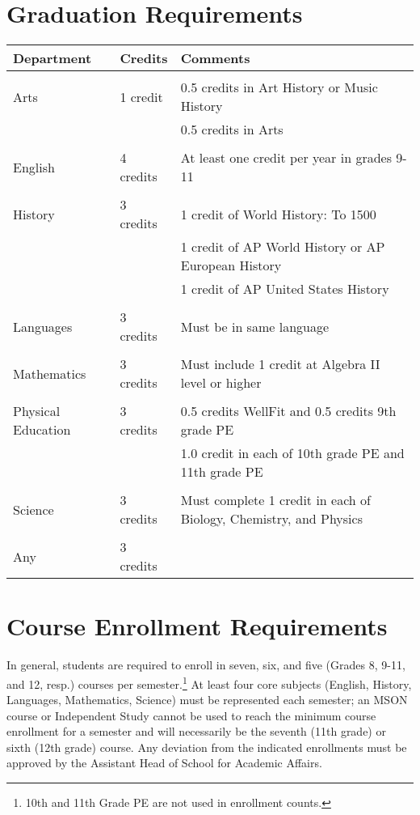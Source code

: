 \section{Graduation Requirements}

\begin{tabular}{lll}
  Department & Credits & Comments\\
  \hline  \hline\\
  Arts & 1 credit& 0.5 credits in Art History or Music History\\
   & & 0.5 credits in Arts\\  
   \\
  English &  4 credits& At least one credit per year in grades 9-11  \\
  \\
  History      &  3 credits&  1 credit of World History:  To 1500\\
              &  &  1 credit of AP World History or AP European History\\  
              &  &  1 credit of AP United States History\\       
   \\                              
  Languages  &  3 credits& Must be in same language  \\
  \\
  Mathematics   &  3 credits& Must include 1 credit at Algebra II level or higher  \\
  \\
  Physical Education   &  3 credits& 0.5 credits WellFit and 0.5 credits 9th grade PE\\
&&  1.0 credit in each of 10th grade PE and 11th grade PE  \\
\\
  Science                    &  3 credits & Must complete 1 credit in each of Biology, Chemistry, and Physics \\
  \\
  Any                        &  3 credits\\
\end{tabular}


\section{Course Enrollment Requirements}

In general, students are required to enroll in seven, six, and five (Grades 8, 9-11, and 12, resp.) courses per semester.\footnote{10th and 11th Grade PE are not used in enrollment counts.}  At least four core subjects (English, History, Languages, Mathematics, Science) must be represented each semester; an MSON course or Independent Study cannot be used to reach the minimum course enrollment for a semester and will necessarily be the seventh (11th grade) or sixth (12th grade) course.  Any deviation from the indicated enrollments must be approved by the Assistant Head of School for Academic Affairs.

